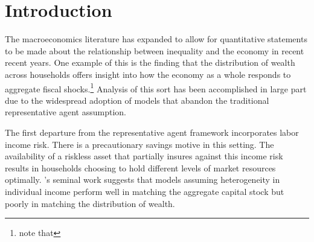 \documentclass[\econtexRoot/Chp1proposal]{subfiles}
\begin{document}
\hypertarget{Introduction}{}
\section{Introduction}\notinsubfile{\label{sec:intro}}
\setcounter{page}{0}



\par The macroeconomics literature has expanded to allow for quantitative statements to be made about the relationship between inequality and the economy in recent recent years. One example of this is the finding that the distribution of wealth across households offers insight into how the economy as a whole responds to aggregate fiscal shocks.\footnote{\cite{jpjsledj2022} note that } Analysis of this sort has been accomplished in large part due to the widespread adoption of models that abandon the traditional representative agent assumption. 

\par The first departure from the representative agent framework incorporates labor income risk. There is a precautionary savings motive in this setting. The availability of a riskless asset that partially insures against this income risk results in households choosing to hold different levels of market resources optimally. \cite{ks1998}'s seminal work suggests that models assuming heterogeneity in individual income perform well in matching the aggregate capital stock but poorly in matching the distribution of wealth. 
\end{document}
